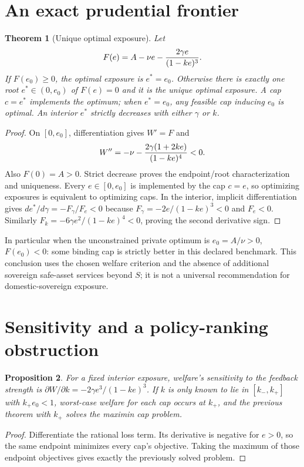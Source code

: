 \documentclass[11pt]{article}
\newtheorem{theorem}{Theorem}
\newtheorem{proposition}[theorem]{Proposition}
\theoremstyle{definition}
\begin{document}
\section*{An exact prudential frontier}
\begin{theorem}[Unique optimal exposure]
Let
\[
 F(e)=A-\nu e-{2\gamma e\over(1-ke)^3}.
\]
If $F(e_0)\ge0$, the optimal exposure is $e^*=e_0$.
Otherwise there is exactly one root $e^*\in(0,e_0)$ of $F(e)=0$ and
it is the unique optimal exposure. A cap $c=e^*$ implements the optimum;
when $e^*=e_0$, any feasible cap inducing $e_0$ is optimal.
An interior $e^*$ strictly decreases with either $\gamma$ or $k$.
\end{theorem}
\begin{proof}
On $[0,e_0]$, differentiation gives $W'=F$ and
\[
 W''=-\nu-{2\gamma(1+2ke)\over(1-ke)^4}<0.
\]
Also $F(0)=A>0$. Strict decrease proves the endpoint/root characterization
and uniqueness. Every $e\in[0,e_0]$ is implemented by the cap $c=e$,
so optimizing exposures is equivalent to optimizing caps. In the interior,
implicit differentiation gives $de^*/d\gamma=-F_\gamma/F_e<0$ because
$F_\gamma=-2e/(1-ke)^3<0$ and $F_e<0$.
Similarly $F_k=-6\gamma e^2/(1-ke)^4<0$, proving the second derivative sign.
\end{proof}

In particular when the unconstrained private optimum is $e_0=A/\nu>0$,
$F(e_0)<0$: some binding cap is strictly better in this declared benchmark.
This conclusion uses the chosen welfare criterion and the absence of
additional sovereign safe-asset services beyond $S$; it is not a universal
recommendation for domestic-sovereign exposure.

\section*{Sensitivity and a policy-ranking obstruction}
\begin{proposition}
For a fixed interior exposure, welfare's sensitivity to the feedback strength
is $\partial W/\partial k=-2\gamma e^3/(1-ke)^3$.
If $k$ is only known to lie in $[k_-,k_+]$ with $k_+e_0<1$, worst-case
welfare for each cap occurs at $k_+$, and the previous theorem with $k_+$
solves the maximin cap problem.
\end{proposition}
\begin{proof}
Differentiate the rational loss term. Its derivative is negative for $e>0$,
so the same endpoint minimizes every cap's objective. Taking the maximum
of those endpoint objectives gives exactly the previously solved problem.
\end{proof}
\end{document}
